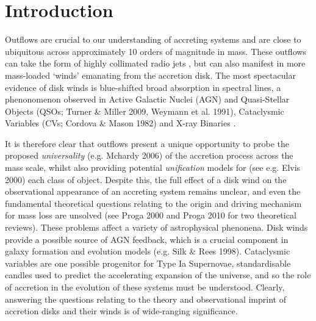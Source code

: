 \documentclass[useAMS,usenatbib,onecolumn]{mn2e2}
\begin{document}



%
%
\section{Introduction}
Outflows are crucial to our understanding of accreting systems and are close to ubiquitous 
across approximately 10 orders of magnitude in mass. These outflows can take the form of 
highly collimated radio jets \citep{bellonijet2010}, but can also manifest in 
more mass-loaded `winds' emanating from the accretion disk. The most spectacular evidence of
disk winds is blue-shifted broad absorption in spectral lines, a phenonomenon observed in 
Active Galactic Nuclei (AGN) and Quasi-Stellar Objects (QSOs; Turner \& Miller 2009, 
Weymann et al. 1991\nocite{turnermiller2009, weymann1991}), Cataclysmic Variables 
(CVs; Cordova \& Mason 1982\nocite{cordova1982}) and X-ray Binaries \citep{ioannau2003}.

It is therefore clear that outflows present a unique opportunity to probe the 
proposed {\sl universality} (e.g. Mchardy 2006) of the accretion process across the mass scale, whilst also 
providing potential {\sl unification} models for (see e.g. Elvis 2000\nocite{elvis2000}) each class of object. 
Despite this, the full effect of a disk wind on the observational appearance of an accreting system
remains unclear, and even the fundamental theoretical questions relating to the origin and driving mechanism
for mass loss are unsolved (see Proga 2000 and Proga 2010 for two theoretical reviews). 
These problems affect a variety of astrophysical phenonena. 
Disk winds provide a possible source of AGN feedback, which is a crucial component in galaxy formation and evolution models (e.g. Silk \& Rees 1998\nocite{silkrees1998}).
Cataclysmic variables are one possible progenitor for Type Ia Supernovae, standardisable candles
used to predict the accelerating expansion of the universe, and so the role of accretion in the evolution
of these systems must be understood. Clearly, answering the questions relating to the theory and observational 
imprint of accretion disks and their winds is of wide-ranging significance.
\end{document}
